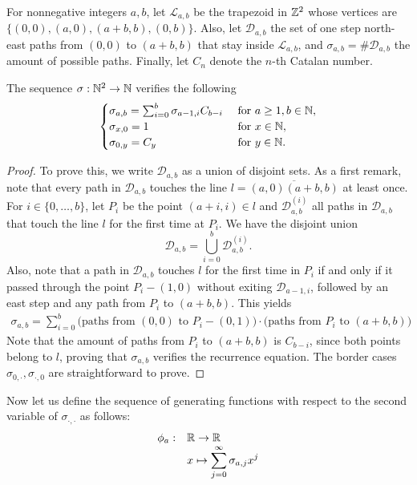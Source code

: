  For nonnegative integers $a,b$, let $\mathcal L_{a,b}$ be the trapezoid in $\mathbb{Z}^2$ whose vertices are
 $\{(0,0),(a,0),(a+b,b),(0,b)\}.$ Also, let $\mathcal D_{a,b}$ the set of one step north-east paths from $(0,0)$ to $(a+b,b)$ that stay inside $\mathcal L_{a,b}$, and $\sigma_{a,b}=\# \mathcal D_{a,b}$ the amount of possible paths. Finally, let $C_n$ denote the $n$-th Catalan number. 
 \begin{myprop}
 	The sequence $\sigma:\mathbb{N}^2\to \mathbb{N}$ verifies the following
 	$$\begin{cases}
 	\sigma_{a,b}=\sum_{i=0}^b\sigma_{a-1,i}C_{b-i}& \mbox{ for }a\geq 1,b\in \mathbb{N},\\
 	\sigma_{x,0}=1 & \mbox{ for }x\in \mathbb{N},\\
 	\sigma_{0,y}=C_y & \mbox{ for }y\in \mathbb{N}.
 	\end{cases}$$
 \end{myprop}
 \begin{proof}
 	To prove this, we write $\mathcal D_{a,b}$ as a union of disjoint sets. As a first remark, note that every path in $\mathcal D_{a,b}$ touches the line $l=\overline{(a,0)(a+b,b)}$ at least once. For $i\in \{0,\dots,b\}$, let $P_i$ be the point $(a+i,i)\in l$ and $\mathcal D_{a,b}^{(i)}$ all paths in $\mathcal D_{a,b}$ that touch the line $l$ for the first time at $P_i$. We have the disjoint union
 	$$\mathcal D_{a,b}=\bigcup_{i=0}^b \mathcal D_{a,b}^{(i)}.$$
 	Also, note that a path in $\mathcal D_{a,b}$ touches $l$ for the first time in $P_i$ if and only if it passed through the point $P_i-(1,0)$ without exiting $\mathcal D_{a-1,i}$, followed by an east step and any path from $P_i$ to $(a+b,b)$. This yields
 	\begin{eqnarray*}
 		\sigma_{a,b}=\sum_{i=0}^{b}\mbox{(paths from $(0,0)$ to $P_i-(0,1))$}\cdot \mbox{(paths from $P_i$ to $(a+b,b))$}
 	\end{eqnarray*}
 	Note that the amount of paths from $P_i$ to $(a+b,b)$ is $C_{b-i}$, since both points belong to $l$, proving that $\sigma_{a,b}$ verifies the recurrence equation. The border cases $\sigma_{0,\cdot},\sigma_{\cdot,0}$ are straightforward to prove.
 \end{proof}
 
 Now let us define the sequence of generating functions with respect to the second variable of $\sigma_{\cdot,\cdot}$ as follows:
 $$\begin{array}{cl}
 \phi_a:&\mathbb{R}\to \mathbb{R}\\
 &x\mapsto \displaystyle \sum_{j=0}^{\infty}\sigma_{a,j}x^j
 \end{array}$$
 
